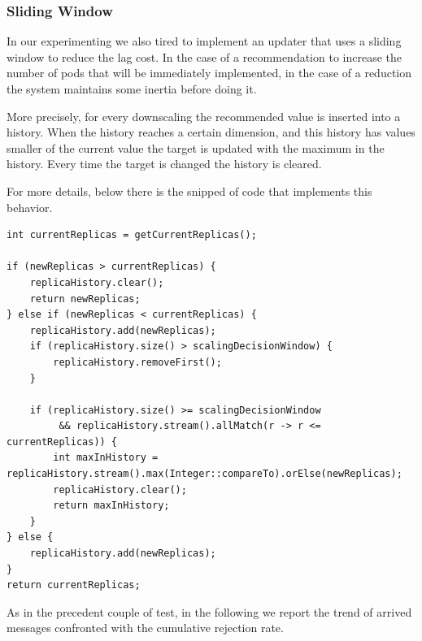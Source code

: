 \subsubsection{Sliding Window}
In our experimenting we also tired to implement an updater that uses a sliding window to reduce the lag cost. In the case of a recommendation to increase the number of pods that will be immediately implemented, in the case of a reduction the system maintains some inertia before doing it.

More precisely, for every downscaling the recommended value is inserted into a history. When the history reaches a certain dimension, and this history has values smaller of the current value the target is updated with the maximum in the history. Every time the target is changed the history is cleared.

For more details, below there is the snipped of code that implements this behavior.

\begin{lstlisting}
int currentReplicas = getCurrentReplicas();

if (newReplicas > currentReplicas) {
	replicaHistory.clear(); 
	return newReplicas;
} else if (newReplicas < currentReplicas) {
	replicaHistory.add(newReplicas);
	if (replicaHistory.size() > scalingDecisionWindow) {
		replicaHistory.removeFirst();	
	}

	if (replicaHistory.size() >= scalingDecisionWindow
         && replicaHistory.stream().allMatch(r -> r <= currentReplicas)) {                
		int maxInHistory = replicaHistory.stream().max(Integer::compareTo).orElse(newReplicas);
		replicaHistory.clear();
		return maxInHistory;
	}
} else {
	replicaHistory.add(newReplicas);
}
return currentReplicas;
\end{lstlisting}

As in the precedent couple of test, in the following we report the trend of arrived messages confronted with the cumulative rejection rate.

